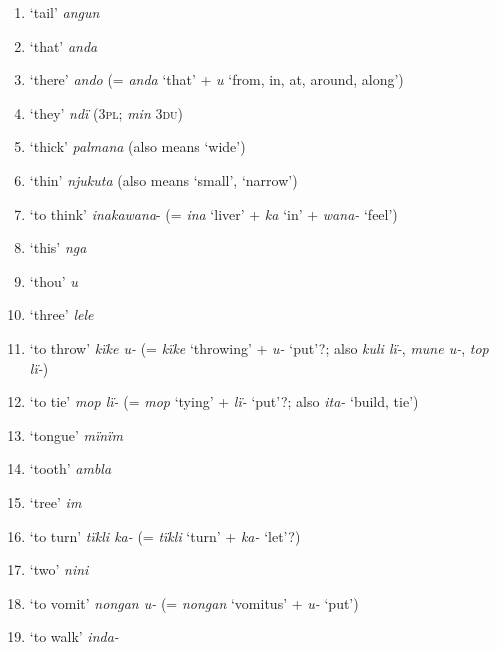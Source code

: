 \begin{enumerate}[noitemsep, label={\arabic*}, align=left, widest=190, labelsep=1ex,leftmargin=*]
\item ‘tail’ \textit{angun}

\item ‘that’ \textit{anda}

\item ‘there’ \textit{ando} (= \textit{anda} ‘that’ + \textit{u} ‘from, in, at, around, along’)

\item ‘they’ \textit{ndï} (3\textsc{pl;} \textit{min} 3\textsc{du})

\item ‘thick’ \textit{palmana} (also means ‘wide’)

\item ‘thin’ \textit{njukuta} (also means ‘small’, ‘narrow’)

\item ‘to think’ \textit{inakawana}{}- (= \textit{ina} ‘liver’ + \textit{ka} ‘in’ + \textit{wana-} ‘feel’)

\item ‘this’ \textit{nga}

\item ‘thou’ \textit{u}

\item ‘three’ \textit{lele}

\item ‘to throw’ \textit{kïke u-} (= \textit{kïke} ‘throwing’ + \textit{u-} ‘put’?; also \textit{kuli lï-}, \textit{mune u-}, \textit{top lï-})

\item ‘to tie’ \textit{mop lï-} (= \textit{mop} ‘tying’ + \textit{lï-} ‘put’?; also \textit{ita-} ‘build, tie’)

\item ‘tongue’ \textit{mïnïm}

\item ‘tooth’ \textit{ambla}

\item ‘tree’ \textit{im}

\item ‘to turn’ \textit{tïkli ka-} (= \textit{tïkli} ‘turn’ + \textit{ka-} ‘let’?)

\item ‘two’ \textit{nini}

\item ‘to vomit’ \textit{nongan u-} (= \textit{nongan} ‘vomitus’ + \textit{u-} ‘put’)

\item ‘to walk’ \textit{inda-}


\end{enumerate}
